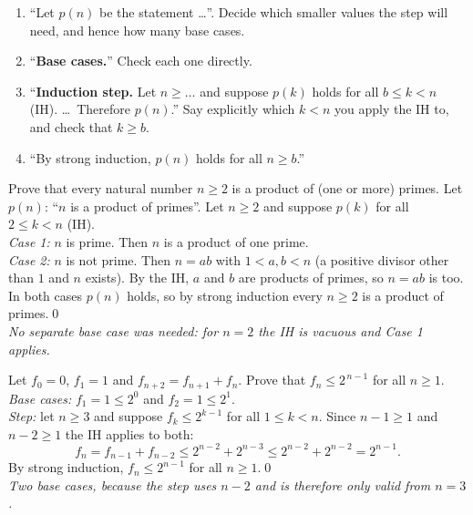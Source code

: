 \begin{strategy}
\begin{enumerate}
\item ``Let $p(n)$ be the statement \dots''. Decide which smaller values the step will need, and hence how many base cases.
\item ``\textbf{Base cases.}'' Check each one directly.
\item ``\textbf{Induction step.} Let $n\ge\dots$ and suppose $p(k)$ holds for all $b\le k<n$ (IH). \dots\ Therefore $p(n)$.'' Say explicitly which $k<n$ you apply the IH to, and check that $k\ge b$.
\item ``By strong induction, $p(n)$ holds for all $n\ge b$.''
\end{enumerate}
\end{strategy}

\begin{hexample}\label{ex:primefactor}
Prove that every natural number $n\ge2$ is a product of (one or more) primes.
\solution
Let $p(n)$: ``$n$ is a product of primes''. Let $n\ge2$ and suppose $p(k)$ for all $2\le k<n$ (IH).\\
\emph{Case 1:} $n$ is prime. Then $n$ is a product of one prime.\\
\emph{Case 2:} $n$ is not prime. Then $n=ab$ with $1<a,b<n$ (a positive divisor other than $1$ and $n$ exists). By the IH, $a$ and $b$ are products of primes, so $n=ab$ is too.\\
In both cases $p(n)$ holds, so by strong induction every $n\ge2$ is a product of primes.\qed\\
\emph{No separate base case was needed: for $n=2$ the IH is vacuous and Case 1 applies.}
\end{hexample}

\begin{hexample}
Let $f_0=0$, $f_1=1$ and $f_{n+2}=f_{n+1}+f_n$. Prove that $f_n\le2^{\,n-1}$ for all $n\ge1$.
\solution
\emph{Base cases:} $f_1=1\le2^0$ and $f_2=1\le2^1$.\\
\emph{Step:} let $n\ge3$ and suppose $f_k\le2^{k-1}$ for all $1\le k<n$. Since $n-1\ge1$ and $n-2\ge1$ the IH applies to both:
\[
f_n=f_{n-1}+f_{n-2}\le2^{n-2}+2^{n-3}\le2^{n-2}+2^{n-2}=2^{n-1}.
\]
By strong induction, $f_n\le2^{n-1}$ for all $n\ge1$.\qed\\
\emph{Two base cases, because the step uses $n-2$ and is therefore only valid from $n=3$.}
\end{hexample}

